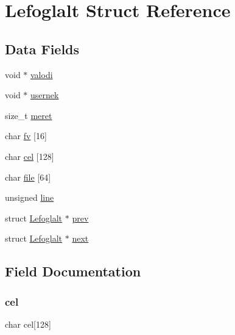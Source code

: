 \hypertarget{struct_lefoglalt}{}\section{Lefoglalt Struct Reference}
\label{struct_lefoglalt}
\subsection*{Data Fields}
\begin{DoxyCompactItemize}
\item 
void $\ast$ \hyperlink{struct_lefoglalt_a59522ad17870bd526fae5bbbc8125966}{valodi}
\item 
void $\ast$ \hyperlink{struct_lefoglalt_a58c09d4017310a90fad327e926330b96}{usernek}
\item 
size\+\_\+t \hyperlink{struct_lefoglalt_a7054394a4199245d774ead13d3bed5d6}{meret}
\item 
char \hyperlink{struct_lefoglalt_abfdd6d3e984090f35c264b15cf69c81a}{fv} \mbox{[}16\mbox{]}
\item 
char \hyperlink{struct_lefoglalt_aa8cbe4c2c142597b17ff65623129109f}{cel} \mbox{[}128\mbox{]}
\item 
char \hyperlink{struct_lefoglalt_a353d29f9f9cc0db6fca9d49b5f88d34d}{file} \mbox{[}64\mbox{]}
\item 
unsigned \hyperlink{struct_lefoglalt_a05ef0c4dbeec4fc8ccb225de9c26d896}{line}
\item 
struct \hyperlink{struct_lefoglalt}{Lefoglalt} $\ast$ \hyperlink{struct_lefoglalt_a2b1e290e1bec4c24cb7ec2aaf8747687}{prev}
\item 
struct \hyperlink{struct_lefoglalt}{Lefoglalt} $\ast$ \hyperlink{struct_lefoglalt_adc30abdfb5e692e2c216e3673d0d19b9}{next}
\end{DoxyCompactItemize}


\subsection{Field Documentation}
\mbox{\label{struct_lefoglalt_aa8cbe4c2c142597b17ff65623129109f}} 
\subsubsection{\texorpdfstring{cel}{cel}}
{\footnotesize\ttfamily char cel\mbox{[}128\mbox{]}}

